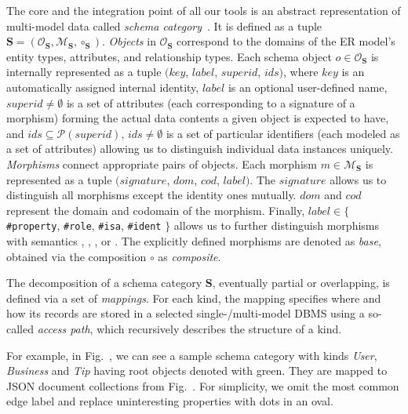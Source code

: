 The core and the integration point of all our tools is an abstract representation of multi-model data called \textit{schema category}~\citep{mm_cat_journal}. It is defined as a tuple $\mathbf{S} = (\mathcal{O}_\mathbf{S}, \mathcal{M}_\mathbf{S}, \circ_\mathbf{S})$. \textit{Objects} in $\mathcal{O}_\mathbf{S}$ correspond to the domains of the ER model's entity types, attributes, and relationship types. 
Each schema object $o \in \mathcal{O}_\mathbf{S}$ is internally represented as a tuple $(key$, $label$, $superid$, $ids)$, where $key$ is an automatically assigned internal identity, $label$ is an optional user-defined name, $superid \ne \emptyset$ is a set of attributes (each corresponding to a signature of a morphism) forming the actual data contents a given object is expected to have, and $ids \subseteq \mathcal{P}(superid)$, $ids \ne \emptyset$ is a set of particular identifiers (each modeled as a set of attributes) allowing us to distinguish individual data instances uniquely.
%
\textit{Morphisms} connect appropriate pairs of objects. Each morphism $m \in \mathcal{M}_\mathbf{S}$ is represented as a tuple $(signature$, $dom$, $cod$, $label)$. The $signature$ allows us to distinguish all morphisms except the identity ones mutually. $dom$ and $cod$ represent the domain and codomain of the morphism. Finally, $label \in \{$ \texttt{\#property}, \texttt{\#role}, \texttt{\#isa}, \texttt{\#ident} $\}$ allows us to further distinguish morphisms with semantics , , , or . The explicitly defined morphisms are denoted as \textit{base}, obtained via the composition $\circ$ as \textit{composite}.


The decomposition of a schema category $\mathbf{S}$, eventually partial or overlapping, is defined via a set of \textit{mappings}. For each kind, the mapping specifies where and how its records are stored in a selected single-/multi-model DBMS using a so-called \textit{access path}, which recursively describes the structure of a kind.

For example, in Fig.~, we can see a sample schema category with kinds \textit{User}, \textit{Business} and \textit{Tip} having root objects denoted with green. They are mapped to JSON document collections from Fig.~. For simplicity, we omit the most common edge label  and replace uninteresting properties with dots in an oval.